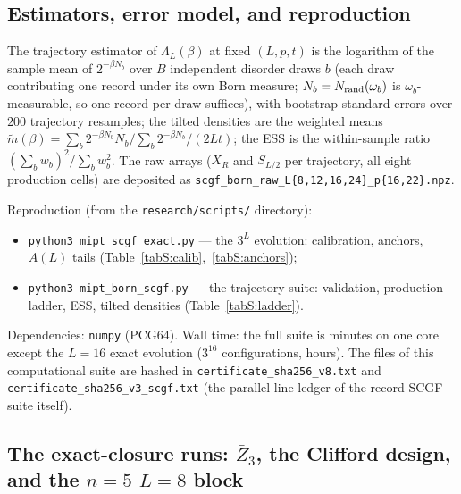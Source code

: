 \documentclass[aps,prx,reprint,superscriptaddress,nobibnotes,longbibliography]{revtex4-2}
\begin{document}
\subsection{Estimators, error model, and reproduction}

The trajectory estimator of $\Lambda_L(\beta)$ at fixed $(L,p,t)$ is the
logarithm of the sample mean of $2^{-\beta N_b}$ over $B$ independent
disorder draws $b$ (each draw contributing one record under its own Born
measure; $N_b=N_{\rm rand}(\omega_b)$ is $\omega_b$-measurable, so one
record per draw suffices), with bootstrap standard errors over $200$
trajectory resamples; the tilted densities are the weighted means
$\tilde m(\beta)=\sum_b2^{-\beta N_b}N_b/\sum_b2^{-\beta N_b}/(2Lt)$; the
ESS is the within-sample ratio
$(\sum_bw_b)^2/\sum_bw_b^2$.  The raw arrays ($X_R$ and $S_{L/2}$ per
trajectory, all eight production cells) are deposited as
\texttt{scgf\_born\_raw\_L\{8,12,16,24\}\_p\{16,22\}.npz}.

Reproduction (from the \texttt{research/scripts/} directory):
\begin{itemize}
\item \texttt{python3 mipt\_scgf\_exact.py} --- the $3^L$ evolution:
calibration, anchors, $A(L)$ tails
(Table~\ref{tabS:calib},~\ref{tabS:anchors});
\item \texttt{python3 mipt\_born\_scgf.py} --- the trajectory suite:
validation, production ladder, ESS, tilted densities
(Table~\ref{tabS:ladder}).
\end{itemize}
Dependencies: \texttt{numpy} (PCG64).  Wall time: the full suite is
minutes on one core except the $L=16$ exact evolution ($3^{16}$
configurations, hours).  The files of this computational suite are hashed in
\texttt{certificate\_sha256\_v8.txt} and
\texttt{certificate\_sha256\_v3\_scgf.txt} (the parallel-line ledger of
the record-SCGF suite itself).


\subsection{The exact-closure runs: $\bar Z_3$, the Clifford design, and the $n=5$ $L=8$ block}
\label{sm:v22closure}
\end{document}
